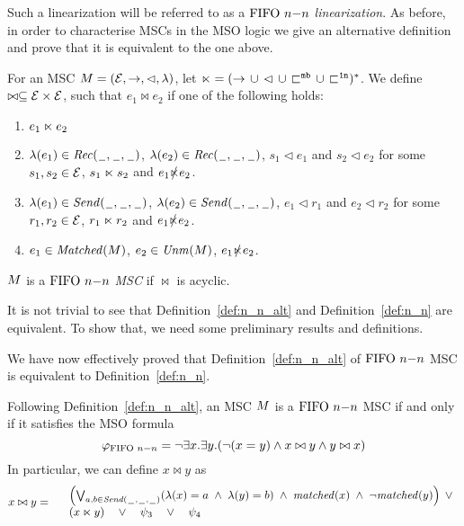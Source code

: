 Such a linearization will be referred to as a \emph{$\nn$ linearization}. 
As before, in order to characterise \nn MSCs in the MSO logic we give an alternative definition and prove that it is equivalent to the one above.






\begin{definition} [$\nn$ alternative]\label{def:n_n_alt}
	For an MSC $M = (\mathcal{E},\to,\lhd,\lambda)$, let ${\ltimes} = ({\to} \,\cup\, {\lhd} \,\cup\, {\sqsubset^{\mathtt{mb}}} \,\cup\, {\sqsubset^{\mathtt{1n}}})^\ast$. We define  $\bowtie \subseteq \mathcal{E} \times \mathcal{E}$,  such that $e_1 \bowtie e_2$ if one of the following holds:
	\begin{enumerate}%
		\item $e_1 \ltimes e_2$
		\item $\lambda(e_1) \in {\mathit{Rec}(\hspace{0.1em}\underline{\hspace{0.5em}}\hspace{0.1em},\hspace{0.1em}\underline{\hspace{0.5em}}\hspace{0.1em},\hspace{0.1em}\underline{\hspace{0.5em}}\hspace{0.1em})}$, $\lambda(e_2) \in {\mathit{Rec}(\hspace{0.1em}\underline{\hspace{0.5em}}\hspace{0.1em},\hspace{0.1em}\underline{\hspace{0.5em}}\hspace{0.1em},\hspace{0.1em}\underline{\hspace{0.5em}}\hspace{0.1em})}$, $s_1 \lhd e_1$ and $s_2 \lhd e_2$ for some $s_1,s_2 \in \mathcal{E}$, $s_1 \ltimes s_2$ and $e_1 \slashed{\ltimes} e_2$.
		\item $\lambda(e_1) \in {\mathit{Send}(\hspace{0.1em}\underline{\hspace{0.5em}}\hspace{0.1em},\hspace{0.1em}\underline{\hspace{0.5em}}\hspace{0.1em},\hspace{0.1em}\underline{\hspace{0.5em}}\hspace{0.1em})}$, $\lambda(e_2) \in {\mathit{Send}(\hspace{0.1em}\underline{\hspace{0.5em}}\hspace{0.1em},\hspace{0.1em}\underline{\hspace{0.5em}}\hspace{0.1em},\hspace{0.1em}\underline{\hspace{0.5em}}\hspace{0.1em})}$, $e_1 \lhd r_1$ and $e_2 \lhd r_2$ for some $r_1,r_2 \in \mathcal{E}$, $r_1 \ltimes r_2$ and $e_1 \slashed{\ltimes} e_2$.
		\item $e_1 \in \mathit{Matched}(M)$, $e_2 \in \mathit{Unm}(M)$, $e_1 \slashed{\ltimes} e_2$.
	\end{enumerate}
	
	$M $ is a \emph{$\nn$ MSC}
	if ${\bowtie}$ is acyclic.
\end{definition}

It is not trivial to see that Definition~\ref{def:n_n_alt} and Definition~\ref{def:n_n} are equivalent. To show that, we need some preliminary results and definitions. 


\noindent We have now effectively proved that Definition~\ref{def:n_n_alt} of $\nn$ MSC is equivalent to Definition~\ref{def:n_n}.

\medskip

Following Definition~\ref{def:n_n_alt}, an MSC $M$ is a $\nn$ MSC if and only if it satisfies the MSO formula
\[
	\varphi_{\text{FIFO } n\mathsf{-}n} = \neg \exists x.\exists y.(\neg (x = y) \wedge x \bowtie y \wedge y \bowtie x)
\]
In particular, we can define $x \bowtie y$ as
\[
	x \bowtie y =
	\begin{array}{rl}
	& \left(
		\bigvee_{\substack{a,b \in {\mathit{Send}(\hspace{0.1em}\underline{\hspace{0.5em}}\hspace{0.1em},\hspace{0.1em}\underline{\hspace{0.5em}}\hspace{0.1em},\hspace{0.1em}\underline{\hspace{0.5em}}\hspace{0.1em})}}}
		(\lambda(x) = a \;\wedge\; \lambda(y) = b)
		\;\wedge\; \mathit{matched}(x) \;\wedge\; \neg \mathit{matched}(y)
	\right) \;\vee\\
	& (x \ltimes y) \quad \vee \quad \psi_3 \quad \vee \quad \psi_4\\
	\end{array}
\]

